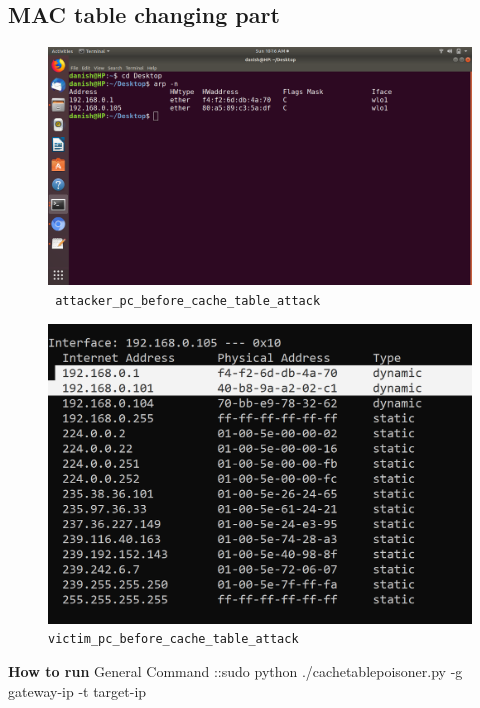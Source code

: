 \documentclass{article}
\begin{document}
\subsection{MAC table changing part}

\begin{figure}[H]
\centering
\includegraphics[width=\textwidth]{images/attacker_pc_before_cache_table_attack.png}
\caption{\texttt{ attacker\_pc\_before\_cache\_table\_attack}}
\end{figure}

\begin{figure}[H]
\centering
\includegraphics[width=\textwidth]{images/victim_pc_before_cache_table_attack.png}
\caption{\texttt{victim\_pc\_before\_cache\_table\_attack}}
\end{figure}
\textbf{How to run}
\newline
General Command ::sudo python ./cachetablepoisoner.py -g   gateway-ip -t   target-ip
\end{document}
